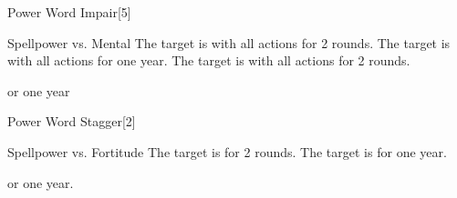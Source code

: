 \begin{spellsection}{Power Word Impair}[5]
    \begin{spellheader}
    \end{spellheader}
    \begin{spellcontent}
        \begin{spelltargetinginfo}
        \end{spelltargetinginfo}
        \begin{spelleffects}
            \begin{spellattack}{Spellpower vs. Mental}
                \spellsuccess The target is \severelyimpaired with all actions for 2 rounds.
                \spellcritical The target is \severelyimpaired with all actions for one year.
                \spellfailure The target is \impaired with all actions for 2 rounds.
            \end{spellattack}
            \spelldur \durbrief or one year
        \end{spelleffects}
    \end{spellcontent}
    \begin{spellfooter}
        \miscastrandom
    \end{spellfooter}
\end{spellsection}

\begin{spellsection}{Power Word Stagger}[2]
    \begin{spellheader}
    \end{spellheader}
    \begin{spellcontent}
        \begin{spelltargetinginfo}
        \end{spelltargetinginfo}
        \begin{spelleffects}
            \begin{spellattack}{Spellpower vs. Fortitude}
                \spellsuccess The target is \staggered for 2 rounds.
                \spellsuccess The target is \staggered for one year.
            \end{spellattack}
            \spelldur \durbrief or one year.
        \end{spelleffects}
    \end{spellcontent}
    \begin{spellfooter}
        \miscastrandom
    \end{spellfooter}
\end{spellsection}


